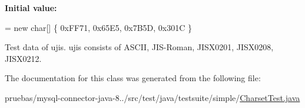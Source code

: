 {\bfseries Initial value\+:}
\begin{DoxyCode}
= \textcolor{keyword}{new} \textcolor{keywordtype}{char}[] \{ 0xFF71, 
            0x65E5, 
            0x7B5D, 
            0x301C 
    \}
\end{DoxyCode}
Test data of ujis. ujis consists of A\+S\+C\+II, J\+I\+S-\/\+Roman, J\+I\+S\+X0201, J\+I\+S\+X0208, J\+I\+S\+X0212. 

The documentation for this class was generated from the following file\+:\begin{DoxyCompactItemize}
\item 
pruebas/mysql-\/connector-\/java-\/8../src/test/java/testsuite/simple/\mbox{\hyperlink{_charset_test_8java}{Charset\+Test.\+java}}\end{DoxyCompactItemize}
